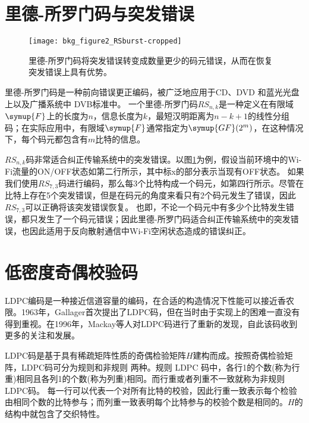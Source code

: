 \section{里德-所罗门码与突发错误}
\begin{figure}
	\centering
	\texttt{[image: bkg\_figure2\_RSburst-cropped]}
	\caption{里德-所罗门码将突发错误转变成数量更少的码元错误，从而在恢复突发错误上具有优势。}
	\label{fig:rscode}
\end{figure}
里德-所罗门码是一种前向错误更正编码，被广泛地应用于CD、DVD 和蓝光光盘上以及广播系统中 DVB标准中。 
一个里德-所罗门码$RS_{n,k}$是一种定义在有限域$\symup{F}$上的长度为$n$，信息长度为$k$，最短汉明距离为$n-k+1$的线性分组码；在实际应用中，有限域$\symup{F}$通常指定为$\symup{GF}(2^m)$，在这种情况下，每个码元都包含有$m$比特的信息。

$RS_{n,k}$码非常适合纠正传输系统中的突发错误。以图\ref{fig:rscode}为例，假设当前环境中的Wi-Fi流量的ON/OFF状态如第二行所示，其中标x的部分表示当现有OFF状态。
如果我们使用$RS_{7,3}$码进行编码，那么每3个比特构成一个码元，如第四行所示。尽管在比特上存在5个突发错误，但是在码元的角度来看只有2个码元发生了错误，因此$RS_{7,3}$可以正确将该突发错误恢复。
也即，不论一个码元中有多少个比特发生错误，都只发生了一个码元错误；因此里德-所罗门码适合纠正传输系统中的突发错误，也因此适用于反向散射通信中Wi-Fi空闲状态造成的错误纠正。
\section{低密度奇偶校验码}

LDPC编码是一种接近信道容量的编码，在合适的构造情况下性能可以接近香农限。1963年，Gallager首次提出了LDPC码，但在当时由于实现上的困难一直没有得到重视。在1996年，Mackay等人对LDPC码进行了重新的发现，自此该码收到更多的关注和发展。

LDPC码是基于具有稀疏矩阵性质的奇偶检验矩阵$H$建构而成。按照奇偶检验矩阵，LDPC码可分为规则和非规则
两种。规则 LDPC 码中，各行1的个数(称为行重)相同且各列1的个数(称为列重)相同。而行重或者列重不一致就称为非规则LDPC码。
每一行可以代表一个对所有比特的校验，因此行重一致表示每个检验由相同个数的比特参与；而列重一致表明每个比特参与的校验个数是相同的。$H$的结构中就包含了交织特性。
